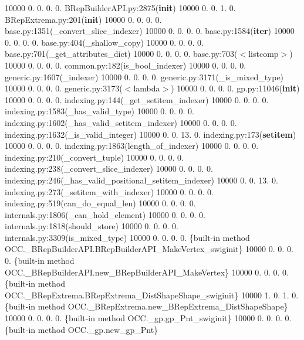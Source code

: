 10000 0. 0. 0. 0. B\+Rep\+Builder\+A\+P\+I.\+py\+:2875({\bfseries init}) 10000 0. 0. 1. 0. B\+Rep\+Extrema.\+py\+:201({\bfseries init}) 10000 0. 0. 0. 0. base.\+py\+:1351(\+\_\+convert\+\_\+slice\+\_\+indexer) 10000 0. 0. 0. 0. base.\+py\+:1584({\bfseries iter}) 10000 0. 0. 0. 0. base.\+py\+:404(\+\_\+shallow\+\_\+copy) 10000 0. 0. 0. 0. base.\+py\+:701(\+\_\+get\+\_\+attributes\+\_\+dict) 10000 0. 0. 0. 0. base.\+py\+:703($<$listcomp$>$) 10000 0. 0. 0. 0. common.\+py\+:182(is\+\_\+bool\+\_\+indexer) 10000 0. 0. 0. 0. generic.\+py\+:1607(\+\_\+indexer) 10000 0. 0. 0. 0. generic.\+py\+:3171(\+\_\+is\+\_\+mixed\+\_\+type) 10000 0. 0. 0. 0. generic.\+py\+:3173($<$lambda$>$) 10000 0. 0. 0. 0. gp.\+py\+:11046({\bfseries init}) 10000 0. 0. 0. 0. indexing.\+py\+:144(\+\_\+get\+\_\+setitem\+\_\+indexer) 10000 0. 0. 0. 0. indexing.\+py\+:1583(\+\_\+has\+\_\+valid\+\_\+type) 10000 0. 0. 0. 0. indexing.\+py\+:1602(\+\_\+has\+\_\+valid\+\_\+setitem\+\_\+indexer) 10000 0. 0. 0. 0. indexing.\+py\+:1632(\+\_\+is\+\_\+valid\+\_\+integer) 10000 0. 0. 13. 0. indexing.\+py\+:173({\bfseries setitem}) 10000 0. 0. 0. 0. indexing.\+py\+:1863(length\+\_\+of\+\_\+indexer) 10000 0. 0. 0. 0. indexing.\+py\+:210(\+\_\+convert\+\_\+tuple) 10000 0. 0. 0. 0. indexing.\+py\+:238(\+\_\+convert\+\_\+slice\+\_\+indexer) 10000 0. 0. 0. 0. indexing.\+py\+:246(\+\_\+has\+\_\+valid\+\_\+positional\+\_\+setitem\+\_\+indexer) 10000 0. 0. 13. 0. indexing.\+py\+:273(\+\_\+setitem\+\_\+with\+\_\+indexer) 10000 0. 0. 0. 0. indexing.\+py\+:519(can\+\_\+do\+\_\+equal\+\_\+len) 10000 0. 0. 0. 0. internals.\+py\+:1806(\+\_\+can\+\_\+hold\+\_\+element) 10000 0. 0. 0. 0. internals.\+py\+:1818(should\+\_\+store) 10000 0. 0. 0. 0. internals.\+py\+:3309(is\+\_\+mixed\+\_\+type) 10000 0. 0. 0. 0. \{built-\/in method O\+C\+C.\+\_\+\+B\+Rep\+Builder\+A\+P\+I.\+B\+Rep\+Builder\+A\+P\+I\+\_\+\+Make\+Vertex\+\_\+swiginit\} 10000 0. 0. 0. 0. \{built-\/in method O\+C\+C.\+\_\+\+B\+Rep\+Builder\+A\+P\+I.\+new\+\_\+\+B\+Rep\+Builder\+A\+P\+I\+\_\+\+Make\+Vertex\} 10000 0. 0. 0. 0. \{built-\/in method O\+C\+C.\+\_\+\+B\+Rep\+Extrema.\+B\+Rep\+Extrema\+\_\+\+Dist\+Shape\+Shape\+\_\+swiginit\} 10000 1. 0. 1. 0. \{built-\/in method O\+C\+C.\+\_\+\+B\+Rep\+Extrema.\+new\+\_\+\+B\+Rep\+Extrema\+\_\+\+Dist\+Shape\+Shape\} 10000 0. 0. 0. 0. \{built-\/in method O\+C\+C.\+\_\+gp.\+gp\+\_\+\+Pnt\+\_\+swiginit\} 10000 0. 0. 0. 0. \{built-\/in method O\+C\+C.\+\_\+gp.\+new\+\_\+gp\+\_\+\+Pnt\}


